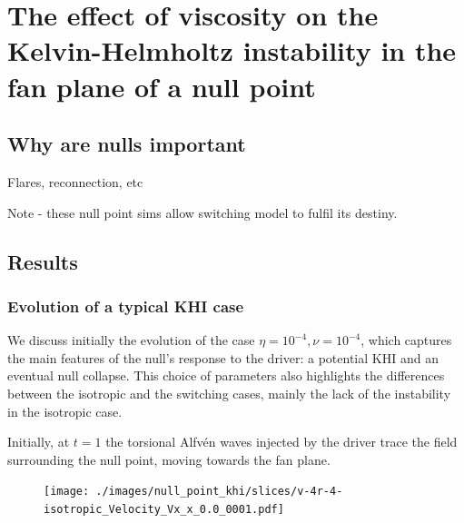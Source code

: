 \chapter{The effect of viscosity on the Kelvin-Helmholtz instability in the fan plane of a null point}

\section{Why are nulls important}

Flares, reconnection, etc

Note - these null point sims allow switching model to fulfil its destiny.

\section{Results}

\subsection{Evolution of a typical KHI case}

We discuss initially the evolution of the case $\eta = 10^{-4}, \nu = 10^{-4}$, which captures the main features of the null's response to the driver: a potential KHI and an eventual null collapse. This choice of parameters also highlights the differences between the isotropic and the switching cases, mainly the lack of the instability in the isotropic case.

Initially, at $t=1$ the torsional Alfv\'en waves injected by the driver trace the field surrounding the null point, moving towards the fan plane.

\begin{figure}[H]
  \centering
  \texttt{[image: ./images/null\_point\_khi/slices/v-4r-4-isotropic\_Velocity\_Vx\_x\_0.0\_0001.pdf]}
\end{figure}



